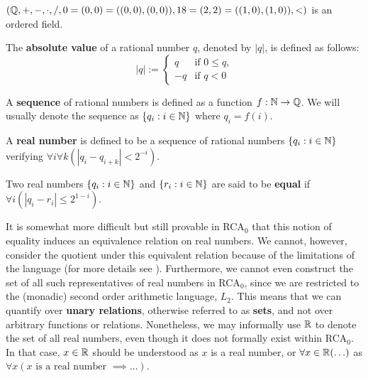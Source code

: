\documentclass[../main.tex]{memoir}
\begin{document}
\begin{theorem}
  $(\mathbb{Q}, +, -, \cdot, /, 0 = (0, 0) = ((0, 0), (0, 0)), 18 = (2, 2) = ((1, 0), (1, 0)), <)$ is an ordered field.
\end{theorem}

\begin{definition}
  The \textbf{absolute value} of a rational number $q$, denoted by $|q|$, is defined as follows:
  \begin{equation}
    |q| := \left\{
    \begin{array}{lr}
      q & \text{if } 0 \le q \text{,} \\
      -q & \text{if } q < 0
    \end{array}
    \right.
  \end{equation}
\end{definition}

\begin{definition}
  A \textbf{sequence} of rational numbers is defined as a function $f: \mathbb{N} \to \mathbb{Q}$. We will usually denote the sequence as $\{q_i: i \in \mathbb{N}\}$ where $q_i = f(i)$.
\end{definition}

\begin{definition}
  A \textbf{real number} is defined to be a sequence of rational numbers $\{q_i: i \in \mathbb{N}\}$ verifying $\forall i \forall k (|q_i - q_{i + k}| < 2^{-i})$.
\end{definition}

\begin{definition}
  Two real numbers $\{q_i: i \in \mathbb{N}\}$ and $\{r_i: i \in \mathbb{N}\}$ are said to be \textbf{equal} if $\forall i (|q_i - r_i| \le 2^{1 - i})$.
\end{definition}

It is somewhat more difficult but still provable in RCA$_0$ that this notion of equality induces an equivalence relation on real numbers. We cannot, however, consider the quotient under this equivalent relation because of the limitations of the language (for more details see \cite{simpson}). Furthermore, we cannot even construct the set of all such representatives of real numbers in RCA$_0$, since we are restricted to the (monadic) second order arithmetic language, $L_2$. This means that we can quantify over \textbf{unary relations}, otherwise referred to as \textbf{sets}, and not over arbitrary functions or relations. Nonetheless, we may informally use $\mathbb{R}$ to denote the set of all real numbers, even though it does not formally exist within RCA$_0$. In that case, $x \in \mathbb{R}$ should be understood as $x$ is a real number, or $\forall x \in \mathbb{R} (\ldots)$ as $\forall x (x \text{ is a real number } \implies \ldots)$. \\
\end{document}
